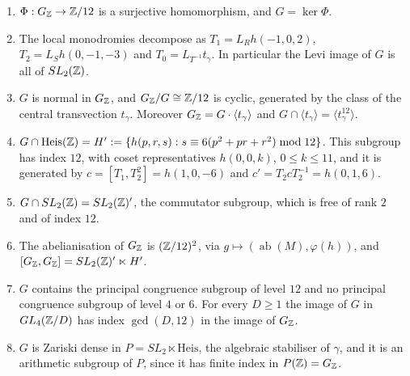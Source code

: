 \begin{theorem}\label{thm:mono}
\begin{enumerate}[label=(\alph*)]
\item $\Phi:G_{\mathbb{Z}}\to\mathbb{Z}/12$ is a surjective homomorphism, and $G=\ker\Phi$.
\item The local monodromies decompose as $T_1=L_Rh(-1,0,2)$, $T_2=L_Sh(0,-1,-3)$ and $T_0=L_{T^{-1}}t_\gamma$. In particular the Levi image of $G$ is all of $SL_2(\mathbb{Z})$.
\item $G$ is normal in $G_{\mathbb{Z}}$, and $G_{\mathbb{Z}}/G\cong\mathbb{Z}/12$ is cyclic, generated by the class of the central transvection $t_\gamma$. Moreover $G_{\mathbb{Z}}=G\cdot\langle t_\gamma\rangle$ and $G\cap\langle t_\gamma\rangle=\langle t_\gamma^{12}\rangle$.
\item $G\cap\mathrm{Heis}(\mathbb{Z})=H':=\{h(p,r,s):s\equiv6(p^2+pr+r^2)\bmod12\}$. This subgroup has index $12$, with coset representatives $h(0,0,k)$, $0\le k\le11$, and it is generated by $c=[T_1,T_2^2]=h(1,0,-6)$ and $c'=T_2cT_2^{-1}=h(0,1,6)$.
\item $G\cap SL_2(\mathbb{Z})=SL_2(\mathbb{Z})'$, the commutator subgroup, which is free of rank $2$ and of index $12$.
\item The abelianisation of $G_{\mathbb{Z}}$ is $(\mathbb{Z}/12)^2$, via $g\mapsto(\operatorname{ab}(M),\varphi(h))$, and $[G_{\mathbb{Z}},G_{\mathbb{Z}}]=SL_2(\mathbb{Z})'\ltimes H'$.
\item $G$ contains the principal congruence subgroup of level $12$ and no principal congruence subgroup of level $4$ or $6$. For every $D\ge1$ the image of $G$ in $GL_4(\mathbb{Z}/D)$ has index $\gcd(D,12)$ in the image of $G_{\mathbb{Z}}$.
\item $G$ is Zariski dense in $P=SL_2\ltimes\mathrm{Heis}$, the algebraic stabiliser of $\gamma$, and it is an arithmetic subgroup of $P$, since it has finite index in $P(\mathbb{Z})=G_{\mathbb{Z}}$.
\end{enumerate}
\end{theorem}
